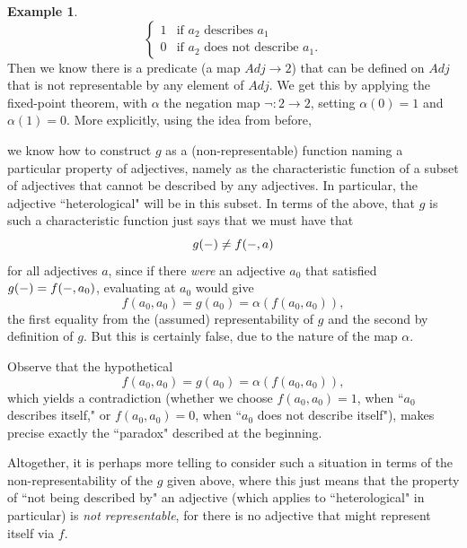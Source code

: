 \documentclass[11pt]{book}
\theoremstyle{definition}
\newtheorem{example}{Example}[section]
\theoremstyle{definition}
\theoremstyle{definition}
\theoremstyle{theorem}
\theoremstyle{definition}
\begin{document}
\begin{example}
\begin{equation*}
\begin{cases}
1 & \text{if }  a_2 \text{ describes } a_1 \\
0 & \text{if  } a_2 \text{ does not describe } a_1. 
\end{cases}
\end{equation*}
Then we know there is a predicate (a map $Adj \rightarrow 2$) that can be defined on $Adj$ that is not representable by any element of $Adj$. We get this by applying the fixed-point theorem, with $\alpha$ the negation map $\neg: 2 \rightarrow 2$, setting $\alpha(0) = 1$ and $\alpha(1) = 0$. More explicitly, using the idea from before, 
\begin{center}
\end{center} 
we know how to construct $g$ as a (non-representable) function naming a particular property of adjectives, namely as the characteristic function of a subset of adjectives that cannot be described by any adjectives. In particular, the adjective ``heterological" will be in this subset. In terms of the above, that $g$ is such a characteristic function just says that we must have that 
\begin{equation*}
g(\--) \neq f(\--, a)
\end{equation*} 
for all adjectives $a$, since if there \textit{were} an adjective $a_0$ that satisfied $g(\--) = f(\--, a_0)$, evaluating at $a_0$ would give 
\begin{equation*}
f(a_0, a_0) = g(a_0) = \alpha(f(a_0, a_0)),
\end{equation*} 
the first equality from the (assumed) representability of $g$ and the second by definition of $g$. But this is certainly false, due to the nature of the map $\alpha$. \par 
Observe that the hypothetical 
\begin{equation*}
f(a_0, a_0) = g(a_0) = \alpha(f(a_0, a_0)),
\end{equation*}
which yields a contradiction (whether we choose $f(a_0, a_0) = 1$, when ``$a_0$ describes itself," or $f(a_0, a_0) = 0$, when ``$a_0$ does not describe itself"), makes precise exactly the ``paradox" described at the beginning. \par 
Altogether, it is perhaps more telling to consider such a situation in terms of the non-representability of the $g$ given above, where this just means that the property of ``not being described by" an adjective (which applies to ``heterological" in particular) is \textit{not representable}, for there is no adjective that might represent itself via $f$.  
\end{example} 
\end{document}
